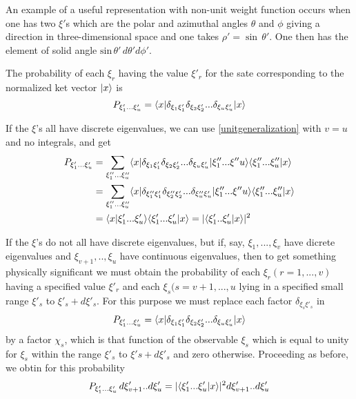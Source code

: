 An example of a useful representation with non-unit weight function occurs when one has two $\xi'$s which are the polar and azimuthal angles $\theta$ and $\phi$ giving a direction in three-dimensional space and one takes $\rho'=\mathrm{\sin} \, \theta'$. One then has the element of solid angle $\mathrm{sin} \, \theta' \, d\theta'd\phi'$.

The probability of each $\xi_r$ having the value $\xi'_r$ for the sate corresponding to the normalized ket vector $| x \rangle$ is
\begin{equation}
P_{\xi'_1...\xi'_u} = \langle x | \delta_{\xi_1\xi'_1}\delta_{\xi_2\xi'_2}...\delta_{\xi_u\xi'_u} | x \rangle
\end{equation}

If the $\xi$'s all have discrete eigenvalues, we can use \ref{unitgeneralization} with $v=u$ and no integrals, and get
\begin{align*}
P_{\xi'_1...\xi'_u} & = \sum_{\xi''_1...\xi''_u} \langle x | \delta_{\xi_1\xi'_1}\delta_{\xi_2\xi'_2}...\delta_{\xi_u\xi'_u} | \xi''_1...\xi''u \rangle\langle \xi''_1...\xi''_u | x \rangle\\
& = \sum_{\xi''_1...\xi''_u} \langle x | \delta_{\xi''_1\xi'_1}\delta_{\xi''_2\xi'_2}...\delta_{\xi''_u\xi'_u} | \xi''_1...\xi''u \rangle\langle \xi''_1...\xi''_u | x \rangle\\
& = \langle x | \xi'_1...\xi'_u \rangle\langle \xi'_1...\xi'_u | x \rangle
=|\langle \xi'_1..\xi'_u | x \rangle|^2
\end{align*}

If the $\xi$'s do not all have discrete eigenvalues, but if, say, $\xi_1,...,\xi_v$ have dicrete eigenvalues and $\xi_{v+1},..,\xi_u$ have continuous eigenvalues, then to get something physically significant we must obtain the probability of each $\xi_r (r=1,...,v)$ having a specified value $\xi'_r$ and each $\xi_s ( s = v+1, ..., u$ lying in a specified small range $\xi'_s$ to $\xi'_s+d\xi'_s$. For this purpose we must replace each factor $\delta_{\xi_s\xi'_s}$ in
\begin{equation*}
P_{\xi'_1...\xi'_u} = \langle x | \delta_{\xi_1\xi'_1}\delta_{\xi_2\xi'_2}...\delta_{\xi_u\xi'_u} | x \rangle
\end{equation*}
by a factor $\chi_s$, which is that function of the observable $\xi_s$ which is equal to unity for $\xi_s$ within the range $\xi'_s$ to $\xi's+d\xi'_s$ and zero otherwise. Proceeding as before, we obtin for this probability
\begin{equation}
P_{\xi'_1...\xi'_u} \, d\xi'_{v+1}..d\xi'_u = |\langle \xi_1'...\xi'_u | x \rangle|^2 d\xi'_{v+1}..d\xi'_u
\end{equation}


